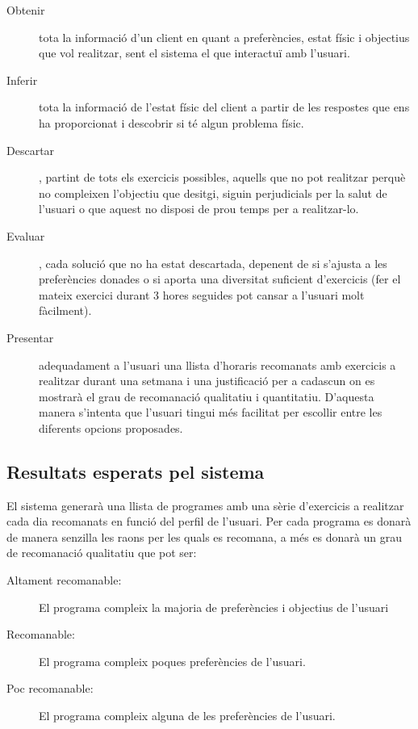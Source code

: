 \documentclass[a4paper, 12pt, UTF8]{article}
\begin{document}
\begin{description}
	\item[Obtenir] tota la informació d'un client en quant a preferències, estat físic i objectius que vol realitzar, sent el sistema el que interactuï amb l'usuari.
	
	\item[Inferir] tota la informació de l'estat físic del client a partir de les respostes que ens ha proporcionat i descobrir si té algun problema físic.
	
	\item[Descartar], partint de tots els exercicis possibles, aquells que no pot realitzar perquè no compleixen l'objectiu que desitgi, siguin perjudicials per la salut de l'usuari o que aquest no disposi de prou temps per a realitzar-lo.
	
	\item[Evaluar], cada solució que no ha estat descartada, depenent de si s'ajusta a les preferències donades o si aporta una diversitat suficient d'exercicis (fer el mateix exercici durant 3 hores seguides pot cansar a l'usuari molt fàcilment).
	
	\item[Presentar] adequadament a l'usuari una llista d'horaris recomanats amb exercicis a realitzar durant una setmana i una justificació per a cadascun	 on es mostrarà el grau de recomanació qualitatiu i quantitatiu. D'aquesta manera s'intenta que l'usuari tingui més facilitat per escollir entre les diferents opcions proposades.
\end{description}

\subsection{Resultats esperats pel sistema}

El sistema generarà una llista de programes amb una sèrie d'exercicis a realitzar cada dia recomanats en funció del perfil de l'usuari. Per cada programa es donarà de manera senzilla les raons per les quals es recomana, a més es donarà un grau de recomanació qualitatiu que pot ser:

\begin{description}
	\item[Altament recomanable:] El programa compleix la majoria de preferències i objectius de l'usuari
	\item[Recomanable:] El programa compleix poques preferències de l'usuari.
	\item[Poc recomanable:] El programa compleix alguna de les preferències de l'usuari.
	
\end{description}
\end{document}

